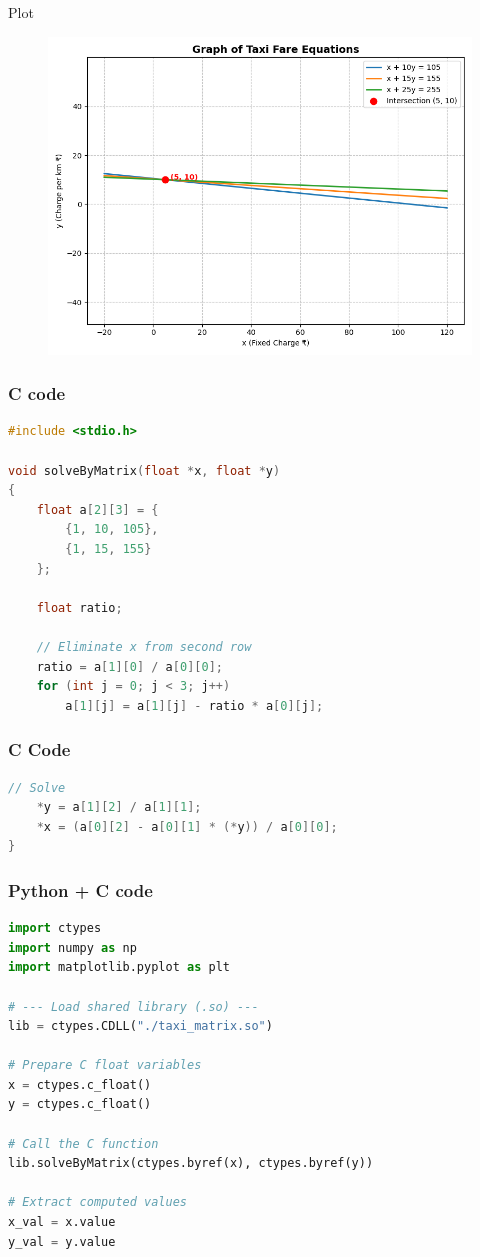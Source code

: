 \documentclass{beamer}
\begin{document}
\begin{frame}{Plot}
    
 \begin{figure}[H]
     \centering
     \includegraphics[width=0.8\columnwidth]{figs/fig.png}
     \label{fig:1}
 \end{figure}
\end{frame}
\begin{frame}[fragile]
\frametitle{C code}
    \begin{lstlisting}[language=C]
#include <stdio.h>

void solveByMatrix(float *x, float *y)
{
    float a[2][3] = {
        {1, 10, 105},
        {1, 15, 155}
    };

    float ratio;

    // Eliminate x from second row
    ratio = a[1][0] / a[0][0];
    for (int j = 0; j < 3; j++)
        a[1][j] = a[1][j] - ratio * a[0][j];

\end{lstlisting}
\end{frame}
\begin{frame}[fragile]
    \frametitle{C Code }
    \begin{lstlisting}[language=C]
         // Solve
    *y = a[1][2] / a[1][1];
    *x = (a[0][2] - a[0][1] * (*y)) / a[0][0];
}

     \end{lstlisting}
\end{frame}
\begin{frame}[fragile]
    \frametitle{Python + C code}

    \begin{lstlisting}[language=Python]
import ctypes
import numpy as np
import matplotlib.pyplot as plt

# --- Load shared library (.so) ---
lib = ctypes.CDLL("./taxi_matrix.so")

# Prepare C float variables
x = ctypes.c_float()
y = ctypes.c_float()

# Call the C function
lib.solveByMatrix(ctypes.byref(x), ctypes.byref(y))

# Extract computed values
x_val = x.value
y_val = y.value


    \end{lstlisting}
\end{frame}
\end{document}
